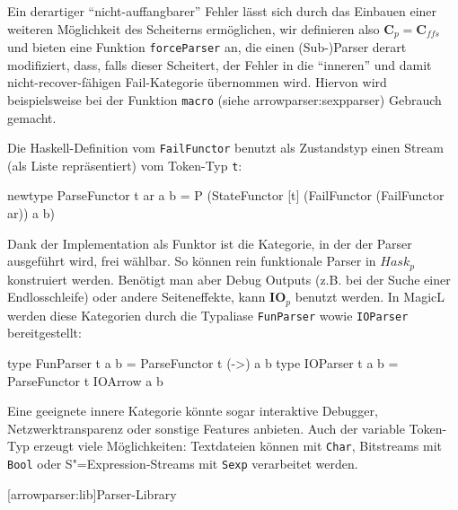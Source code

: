 \documentclass[11pt, a4paper, bibgerm]{scrbook}
\newcommand\icode[1]{\lstinline?#1?}
\newcommand\lsection{}
\newcommand\sref{}
\newcommand{\sees}[1]{(siehe \sref{#1})}
\newcommand{\sexp}{S"=Expression}
\begin{document}
Ein derartiger "`nicht-auffangbarer"' Fehler lässt sich durch das
Einbauen einer weiteren Möglichkeit des Scheiterns ermöglichen, wir
definieren also $\mathbf{C}_p = \mathbf{C}_{ffs}$ und bieten eine
Funktion \icode{forceParser} an, die einen (Sub-)Parser derart
modifiziert, dass, falls dieser Scheitert, der Fehler in die "`inneren"'
und damit nicht-recover-fähigen Fail-Kategorie übernommen wird. Hiervon
wird beispielsweise bei der Funktion \icode{macro}
\sees{arrowparser:sexpparser} Gebrauch gemacht.

Die Haskell-Definition vom \icode{FailFunctor} benutzt als Zustandstyp
einen Stream (als Liste repräsentiert) vom Token-Typ \icode{t}:

\begin{code}
newtype ParseFunctor t ar a b =
  P (StateFunctor
     [t]
     (FailFunctor (FailFunctor ar))
     a
     b)
\end{code}

Dank der Implementation als Funktor ist die Kategorie, in der der Parser
ausgeführt wird, frei wählbar. So können rein funktionale Parser in
$Hask_p$ konstruiert werden. Benötigt man aber Debug Outputs (z.B. bei
der Suche einer Endlosschleife) oder andere Seiteneffekte, kann
$\mathbf{IO}_p$ benutzt werden. In MagicL werden diese Kategorien durch
die Typaliase \icode{FunParser} wowie \icode{IOParser} bereitgestellt:
\begin{code}
type FunParser t a b = ParseFunctor t (->) a b
type IOParser  t a b = ParseFunctor t IOArrow a b
\end{code}
Eine geeignete innere Kategorie könnte
sogar interaktive Debugger, Netzwerktransparenz oder sonstige Features
anbieten. Auch der variable Token-Typ erzeugt viele Möglichkeiten:
Textdateien können mit \icode{Char}, Bitstreams mit \icode{Bool} oder
\sexp{}-Streams mit \icode{Sexp} verarbeitet werden.

\lsection[arrowparser:lib]{Parser-Library}
\end{document}
